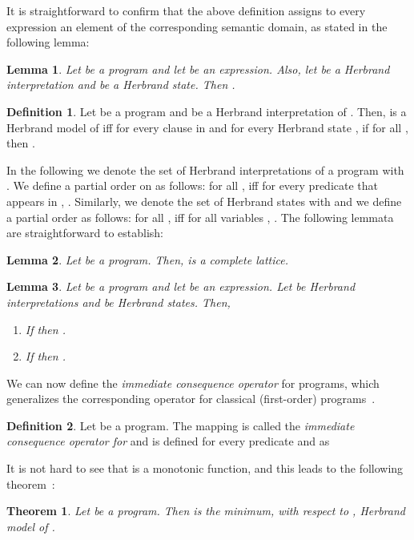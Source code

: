 \documentclass[submission,copyright]{eptcs}
\newtheorem{theorem}{Theorem}
\newtheorem{lemma}{Lemma}
\theoremstyle{definition}
\newtheorem{definition}{Definition}
\begin{document}
It is straightforward to confirm that the above definition assigns to every expression an element of the corresponding semantic domain, as stated in the following lemma:
\begin{lemma}
Let  be a program and let  be an expression. Also, let  be a Herbrand interpretation and  be a Herbrand state. Then .
\end{lemma}

\begin{definition}
Let  be a program and  be a Herbrand interpretation of .
Then,  is a Herbrand model of  iff for every clause
 in 
and for every Herbrand state , if for all ,  then
.
\end{definition}
In the following we denote the set of Herbrand interpretations of a program 
with . We define a partial order on  as
follows: for all , 
iff for every predicate  that appears in , .
Similarly, we denote the set of Herbrand states with  and we define
a partial order as follows: for all ,  iff
for all variables , .
The following lemmata are straightforward to establish:
\begin{lemma}
Let  be a program. Then,  is a complete lattice.
\end{lemma}

\begin{lemma} \label{interp-state-monotonicity}
Let  be a program and let  be an expression.
Let  be Herbrand interpretations and  be Herbrand states.
Then,
\begin{enumerate}
  \item If   then .
  \item If  then .
\end{enumerate}
\end{lemma}


We can now define the {\em immediate consequence operator} for
 programs, which generalizes the corresponding operator for classical (first-order)
programs~\cite{lloyd}.
\begin{definition}
  Let  be a program. The mapping 
  is called the {\em immediate consequence operator for } and is defined for every predicate
   and  as

\end{definition}



It is not hard to see that  is a monotonic function, and this leads to
the following theorem~\cite{Wa91a,KRW05}:
\begin{theorem}
Let  be a program.
Then 
is the minimum, with respect to , Herbrand model of .
\end{theorem}
\end{document}
